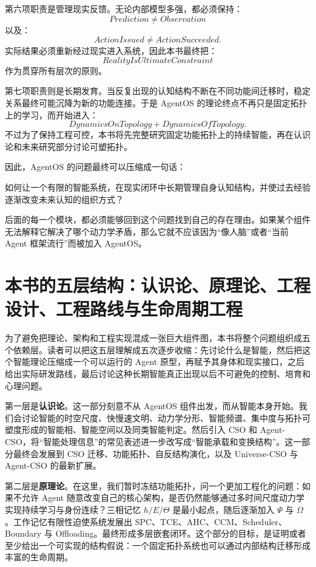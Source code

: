 第六项职责是管理现实反馈。无论内部模型多强，都必须保持：
\[
Prediction
\neq
Observation
\]
以及：
\[
ActionIssued
\neq
ActionSucceeded.
\]
实际结果必须重新经过现实进入系统，因此本书最终把：
\[
RealityIsUltimateConstraint
\]
作为贯穿所有层次的原则。

第七项职责则是长期发育。当反复出现的认知结构不断在不同功能间迁移时，稳定关系最终可能沉降为新的功能连接。于是 AgentOS 的理论终点不再只是固定拓扑上的学习，而开始进入：
\[
DynamicsOnTopology
+
DynamicsOfTopology.
\]
不过为了保持工程可控，本书将先完整研究固定功能拓扑上的持续智能，再在认识论和未来研究部分讨论可塑拓扑。

因此，AgentOS 的问题最终可以压缩成一句话：

\begin{statementbox}
如何让一个有限的智能系统，在现实闭环中长期管理自身认知结构，并使过去经验逐渐改变未来认知的组织方式？
\end{statementbox}

后面的每一个模块，都必须能够回到这个问题找到自己的存在理由。如果某个组件无法解释它解决了哪个动力学矛盾，那么它就不应该因为“像人脑”或者“当前 Agent 框架流行”而被加入 AgentOS。

\section{本书的五层结构：认识论、原理论、工程设计、工程路线与生命周期工程}

为了避免把理论、架构和工程实现混成一张巨大组件图，本书将整个问题组织成五个依赖层。读者可以把这五层理解成五次逐步收缩：先讨论什么是智能，然后把这个智能理论压缩成一个可以运行的 Agent 原型，再赋予其身体和现实接口，之后给出实际研发路线，最后讨论这种长期智能真正出现以后不可避免的控制、培育和心理问题。

第一层是\textbf{认识论}。这一部分刻意不从 AgentOS 组件出发，而从智能本身开始。我们会讨论智能的时空尺度、快慢速文明、动力学分形、智能频谱、集中度与拓扑可塑度形成的智能相、智能空间以及同类智能判定。然后引入 CSO 和 Agent-CSO，将“智能处理信息”的常见表述进一步改写成“智能承载和变换结构”。这一部分最终会发展到 CSO 迁移、功能拓扑、自反结构演化，以及 Universe-CSO 与 Agent-CSO 的最新扩展。

第二层是\textbf{原理论}。在这里，我们暂时冻结功能拓扑，问一个更加工程化的问题：如果不允许 Agent 随意改变自己的核心架构，是否仍然能够通过多时间尺度动力学实现持续学习与身份连续？三相记忆 $h/E/\Theta$ 是最小起点，随后逐渐加入 $\Psi$ 与 $\Omega$。工作记忆有限性迫使系统发展出 SPC、TCE、AHC、CCM、Scheduler、Boundary 与 Offloading。最终形成多层嵌套闭环。这个部分的目标，是证明或者至少给出一个可实现的结构假说：一个固定拓扑系统也可以通过内部结构迁移形成丰富的生命周期。

